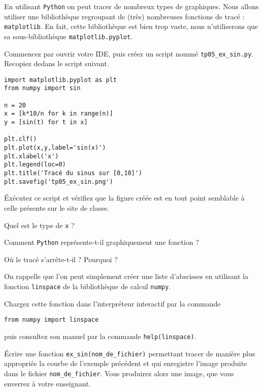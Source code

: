 
En utilisant \texttt{Python}{} on peut tracer de nombreux types de graphiques. 
Nous allons utiliser une bibliothèque regroupant de (très) nombreuses fonctions de tracé : \texttt{matplotlib}.
En fait, cette bibliothèque est bien trop vaste, nous n'utiliserons que sa sous-bibliothèque \texttt{matplotlib.pyplot}.

Commencez par ouvrir votre IDE, puis créez un script nommé \texttt{tp05\_ex\_sin.py}. Recopiez dedans le script suivant. 
\begin{lstlisting}
import matplotlib.pyplot as plt
from numpy import sin

n = 20
x = [k*10/n for k in range(n)]
y = [sin(t) for t in x]

plt.clf()
plt.plot(x,y,label='sin(x)')
plt.xlabel('x')
plt.legend(loc=0)
plt.title('Tracé du sinus sur [0,10]')
plt.savefig('tp05_ex_sin.png')
\end{lstlisting}
\'Exécutez ce script et vérifiez que la figure créée est en tout point semblable à celle présente sur le site de classe. 

\medskip{}

\question{} Quel est le type de \texttt{x} ?

\medskip{}

\question{} Comment \texttt{Python}{} représente-t-il graphiquement une fonction ? 

\medskip{}

\question{} Où le tracé s'arrête-t-il ? Pourquoi ? 

\medskip{}

On rappelle que l'on peut simplement créer une liste d'abscisses en utilisant la fonction \texttt{linspace} de la bibliothèque de calcul \texttt{numpy}. 

Chargez cette fonction dans l'interpréteur interactif par la commande 
\begin{lstlisting}
from numpy import linspace
\end{lstlisting}
puis consultez son manuel par la commande \texttt{help(linspace)}. 

\medskip{}

\question{}\label{tp05:qu:sin2} Écrire une fonction \texttt{ex\_sin(nom\_de\_fichier)} permettant tracer de manière plus appropriée la courbe de l'exemple précédent et qui enregistre l'image produite dans le fichier \texttt{nom\_de\_fichier}. 
Vous produirez alors une image, que vous enverrez à votre enseignant. 

